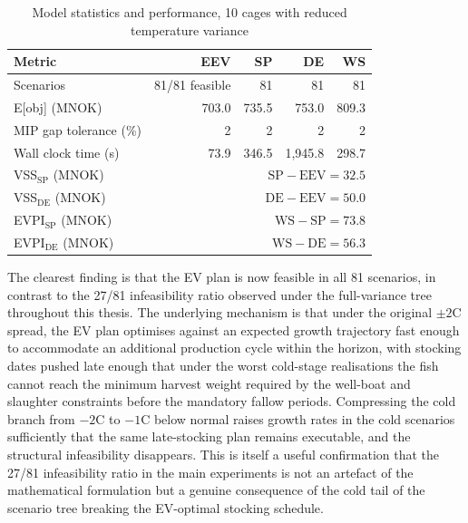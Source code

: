 \documentclass[12pt,a4paper]{article}
\begin{document}
\begin{table}[htbp]
\centering
\caption{Model statistics and performance, 10 cages with reduced temperature variance}
\label{tab:model_stats_low_variance}
\footnotesize
\begin{tabularx}{\linewidth}{lRRRR}
\toprule
\textbf{Metric} & \textbf{EEV} & \textbf{SP} & \textbf{DE} & \textbf{WS} \\
\midrule
Scenarios              & 81/81 feasible & 81 & 81 & 81 \\
E[obj] (MNOK)          & 703.0          & 735.5         & 753.0       & 809.3 \\
MIP gap tolerance (\%) & 2              & 2             & 2           & 2 \\
Wall clock time (s)    & 73.9           & 346.5         & 1{,}945.8   & 298.7 \\
\midrule
VSS$_{\text{SP}}$ (MNOK)  &  \\
VSS$_{\text{DE}}$ (MNOK)  &  \\
EVPI$_{\text{SP}}$ (MNOK) &  \\
EVPI$_{\text{DE}}$ (MNOK) &  \\
\bottomrule
\end{tabularx}
\end{table}

The clearest finding is that the EV plan is now feasible in all 81
scenarios, in contrast to the 27/81 infeasibility ratio observed under
the full-variance tree throughout this thesis. The underlying mechanism
is that under the original $\pm 2$\textdegree C spread, the EV plan optimises against an expected growth trajectory fast enough
to accommodate an additional production cycle within the horizon, with
stocking dates pushed late enough that under the worst cold-stage
realisations the fish cannot reach the minimum harvest weight required
by the well-boat and slaughter constraints before the mandatory fallow
periods. Compressing the cold branch from $-2$\textdegree C to
$-1$\textdegree C below normal raises growth rates in the cold scenarios
sufficiently that the same late-stocking plan remains executable, and
the structural infeasibility disappears. This is itself a useful confirmation that the 27/81 infeasibility ratio
in the main experiments is not an artefact of the mathematical
formulation but a genuine consequence of the cold tail of the scenario
tree breaking the EV-optimal stocking schedule.
\end{document}
